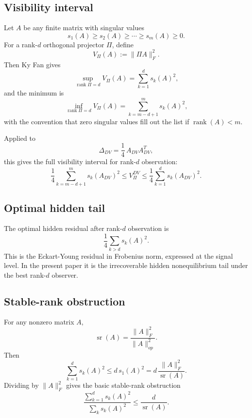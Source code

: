 \documentclass[11pt,a4paper]{article}
\numberwithin{equation}{section}
\theoremstyle{thmcompact}
\theoremstyle{remark}
\begin{document}
\subsection{Visibility interval}

Let \(A\) be any finite matrix with singular values
\begin{equation}
s_1(A)\ge s_2(A)\ge \cdots \ge s_m(A)\ge 0.
\end{equation}
For a rank-\(d\) orthogonal projector \(\Pi\), define
\begin{equation}
V_\Pi(A):=\|\Pi A\|_F^2.
\end{equation}
Then Ky Fan gives
\begin{equation}
\sup_{\operatorname{rank}\Pi=d}V_\Pi(A)=\sum_{k=1}^d s_k(A)^2,
\end{equation}
and the minimum is
\begin{equation}
\inf_{\operatorname{rank}\Pi=d}V_\Pi(A)
=
\sum_{k=m-d+1}^{m}s_k(A)^2,
\end{equation}
with the convention that zero singular values fill out the list if \(\operatorname{rank}(A)<m\).

Applied to
\begin{equation}
\Delta_{DV}=\frac14\,A_{DV}A_{DV}^T,
\end{equation}
this gives the full visibility interval for rank-\(d\) observation:
\begin{equation}
\frac14\sum_{k=m-d+1}^{m}s_k(A_{DV})^2
\le
V_\Pi^{DV}
\le
\frac14\sum_{k=1}^{d}s_k(A_{DV})^2.
\end{equation}

\subsection{Optimal hidden tail}

The optimal hidden residual after rank-\(d\) observation is
\begin{equation}
\frac14\sum_{k>d}s_k(A)^2.
\end{equation}
This is the Eckart-Young residual in Frobenius norm, expressed at the signal level. In the present paper it is the irrecoverable hidden nonequilibrium tail under the best rank-\(d\) observer.

\subsection{Stable-rank obstruction}

For any nonzero matrix \(A\),
\begin{equation}
\operatorname{sr}(A)=\frac{\|A\|_F^2}{\|A\|_{op}^2}.
\end{equation}
Then
\begin{equation}
\sum_{k=1}^{d}s_k(A)^2\le d\,s_1(A)^2
=
d\,\frac{\|A\|_F^2}{\operatorname{sr}(A)}.
\end{equation}
Dividing by \(\|A\|_F^2\) gives the basic stable-rank obstruction
\begin{equation}
\frac{\sum_{k=1}^{d}s_k(A)^2}{\sum_k s_k(A)^2}
\le
\frac{d}{\operatorname{sr}(A)}.
\end{equation}
\end{document}
